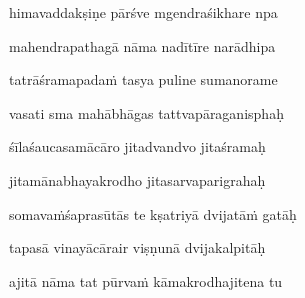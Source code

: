 himavaddakṣiṇe pārśve mgendraśikhare npa\thinspace{\dandab} \dontdisplaylinenum

mahendrapathagā nāma nadītīre narādhipa \veg\dontdisplaylinenum

tatrāśramapada\.m tasya puline sumanorame\thinspace{\dandab} \dontdisplaylinenum

vasati sma mahābhāgas tattvapāraganisphaḥ \veg\dontdisplaylinenum

śīlaśaucasamācāro jitadvandvo jitaśramaḥ\thinspace{\dandab} \dontdisplaylinenum

jitamānabhayakrodho jitasarvaparigrahaḥ \veg\dontdisplaylinenum

somava\.mśaprasūtās te kṣatriyā dvijatā\.m gatāḥ\thinspace{\dandab} \dontdisplaylinenum

tapasā vinayācārair viṣṇunā dvijakalpitāḥ \veg\dontdisplaylinenum

ajitā nāma tat pūrva\.m kāmakrodhajitena tu\thinspace{\dandab} \dontdisplaylinenum

